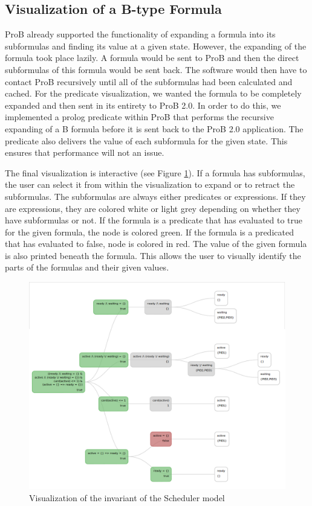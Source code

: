 \subsection{Visualization of a B-type Formula}

ProB already supported the functionality of expanding a formula into its subformulas and finding its value at a given state. However, the expanding of the formula took place lazily. A formula would be sent to ProB and then the direct subformulas of this formula would be sent back. The software would then have to contact ProB recursively until all of the subformulas had been calculated and cached. For the predicate visualization, we wanted the formula to be completely expanded and then sent in its entirety to ProB 2.0. In order to do this, we implemented a prolog predicate within ProB that performs the recursive expanding of a B formula before it is sent back to the ProB 2.0 application. The predicate also delivers the value of each subformula for the given state. This ensures that performance will not an issue. 

The final visualization is interactive (see Figure \ref{predicate}). If a formula has subformulas, the user can select it from within the visualization to expand or to retract the subformulas. The subformulas are always either predicates or expressions. If they are expressions, they are colored white or light grey depending on whether they have subformulas or not. If the formula is a predicate that has evaluated to true for the given formula, the node is colored green. If the formula is a predicated that has evaluated to false, node is colored in red. The value of the given formula is also printed beneath the formula. This allows the user to visually identify the parts of the formulas and their given values. 

\begin{center}
\begin{figure}[h!]
\includegraphics[width=14cm]{bilder/invariant.png}
\caption{Visualization of the invariant of the Scheduler model}
\label{predicate}
\end{figure}
\end{center}

